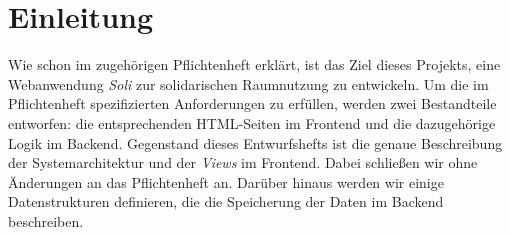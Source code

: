 
\chapter{Einleitung}
\label{ch:preface}

Wie schon im zugehörigen Pflichtenheft erklärt, ist das Ziel dieses Projekts, eine Webanwendung \textit{Soli} zur solidarischen Raumnutzung zu entwickeln.
Um die im Pflichtenheft spezifizierten Anforderungen zu erfüllen, werden zwei Bestandteile entworfen: die entsprechenden HTML-Seiten im Frontend und die dazugehörige Logik im Backend.
Gegenstand dieses Entwurfshefts ist die genaue Beschreibung der Systemarchitektur und der \textit{Views} im Frontend. Dabei schließen wir ohne Änderungen an das Pflichtenheft an.
Darüber hinaus werden wir einige Datenstrukturen definieren, die die Speicherung der Daten im Backend beschreiben.